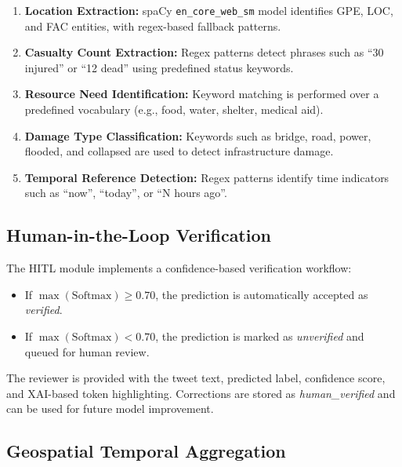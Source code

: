 \documentclass[pdflatex,sn-mathphys-num]{sn-jnl}%
\theoremstyle{thmstyleone}%
\theoremstyle{thmstyletwo}%
\theoremstyle{thmstylethree}%
\begin{document}
\begin{enumerate}
    \item \textbf{Location Extraction:} spaCy \texttt{en\_core\_web\_sm} model identifies GPE, LOC, and FAC entities, with regex-based fallback patterns.
    
    \item \textbf{Casualty Count Extraction:} Regex patterns detect phrases such as ``30 injured'' or ``12 dead'' using predefined status keywords.
    
    \item \textbf{Resource Need Identification:} Keyword matching is performed over a predefined vocabulary (e.g., food, water, shelter, medical aid).
    
    \item \textbf{Damage Type Classification:} Keywords such as bridge, road, power, flooded, and collapsed are used to detect infrastructure damage.
    
    \item \textbf{Temporal Reference Detection:} Regex patterns identify time indicators such as ``now'', ``today'', or ``N hours ago''.
\end{enumerate}

\subsection{Human-in-the-Loop Verification}

The HITL module implements a confidence-based verification workflow:

\begin{itemize}
    \item If $\max(\text{Softmax}) \geq 0.70$, the prediction is automatically accepted as \textit{verified}.
    
    \item If $\max(\text{Softmax}) < 0.70$, the prediction is marked as \textit{unverified} and queued for human review.
\end{itemize}

The reviewer is provided with the tweet text, predicted label, confidence score, and XAI-based token highlighting. Corrections are stored as \textit{human\_verified} and can be used for future model improvement.

\subsection{Geospatial Temporal Aggregation}
\end{document}
